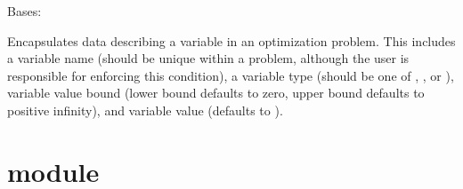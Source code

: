 \documentclass[letterpaper,10pt,english]{sphinxmanual}
\begin{document}
\begin{fulllineitems}
\label{\detokenize{opt:opt.Variable}}
Bases: 

Encapsulates data describing a variable in an optimization problem. This includes a variable name (should be unique within a problem, although the user is responsible for enforcing this condition), a variable type (should be one of , , or ), variable value bound (lower bound defaults to zero, upper bound defaults to positive infinity), and variable value (defaults to ).

\end{fulllineitems}



\section{ module}
\label{\detokenize{spatial::doc}}\label{\detokenize{spatial:spatial-module}}\label{\detokenize{spatial:module-spatial}}
\end{document}
